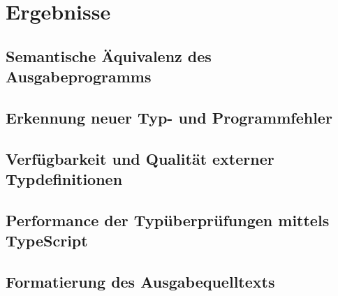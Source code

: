 \chapter{Ergebnisse}

\section{Semantische Äquivalenz des Ausgabeprogramms}

\section{Erkennung neuer Typ- und Programmfehler}

\section{Verfügbarkeit und Qualität externer Typdefinitionen}

\section{Performance der Typüberprüfungen mittels TypeScript}

\section{Formatierung des Ausgabequelltexts}
